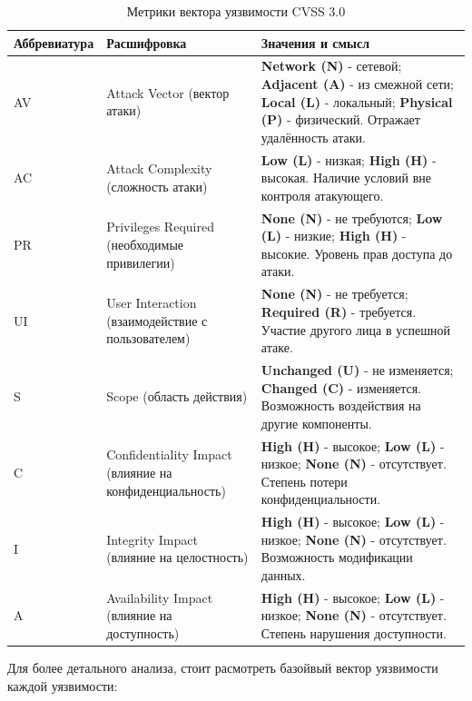 \documentclass[areasetadvanced]{scrartcl}
\begin{document}
\begin{table}[H]
\centering
\small
\caption{Метрики вектора уязвимости CVSS 3.0}
\label{tab:cvss3}
\begin{tabularx}{\textwidth}{|l|l|X|}
\hline
\textbf{Аббревиатура} & \textbf{Расшифровка} & \textbf{Значения и смысл} \\
\hline
AV  & Attack Vector (вектор атаки) & \textbf{Network (N)} - сетевой; \textbf{Adjacent (A)} - из смежной сети; \textbf{Local (L)} - локальный; \textbf{Physical (P)} - физический. Отражает удалённость атаки. \\
\hline
AC  & Attack Complexity (сложность атаки) & \textbf{Low (L)} - низкая; \textbf{High (H)} - высокая. Наличие условий вне контроля атакующего. \\
\hline
PR  & Privileges Required (необходимые привилегии) & \textbf{None (N)} - не требуются; \textbf{Low (L)} - низкие; \textbf{High (H)} - высокие. Уровень прав доступа до атаки. \\
\hline
UI  & User Interaction (взаимодействие с пользователем) & \textbf{None (N)} - не требуется; \textbf{Required (R)} - требуется. Участие другого лица в успешной атаке. \\
\hline
S   & Scope (область действия) & \textbf{Unchanged (U)} - не изменяется; \textbf{Changed (C)} - изменяется. Возможность воздействия на другие компоненты. \\
\hline
C   & Confidentiality Impact (влияние на конфиденциальность) & \textbf{High (H)} - высокое; \textbf{Low (L)} - низкое; \textbf{None (N)} - отсутствует. Степень потери конфиденциальности. \\
\hline
I   & Integrity Impact (влияние на целостность) & \textbf{High (H)} - высокое; \textbf{Low (L)} - низкое; \textbf{None (N)} - отсутствует. Возможность модификации данных. \\
\hline
A   & Availability Impact (влияние на доступность) & \textbf{High (H)} - высокое; \textbf{Low (L)} - низкое; \textbf{None (N)} - отсутствует. Степень нарушения доступности. \\
\hline
\end{tabularx}
\end{table}


Для более детального анализа, стоит расмотреть базойвый вектор уязвимости каждой уязвимости:
\end{document}
